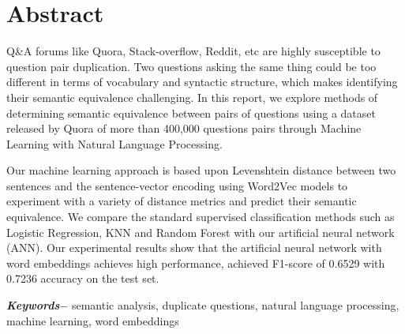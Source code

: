 \chapter*{Abstract} %
Q\&A forums like Quora, Stack-overflow, Reddit, etc are highly susceptible to question pair duplication. Two questions asking the same thing could be too different in terms of vocabulary and syntactic structure, which makes identifying their semantic equivalence challenging. In this report, we explore methods of determining semantic equivalence between pairs of questions using a dataset released by Quora of more than 400,000 questions pairs through Machine Learning with Natural Language Processing. 

Our machine learning approach is based upon Levenshtein distance between two sentences and the sentence-vector encoding using Word2Vec models to experiment with a variety of distance metrics and predict their semantic equivalence. We compare the standard supervised classification methods such as Logistic Regression, KNN and Random Forest with our artificial neural network (ANN). Our experimental results show that the artificial neural network with word embeddings achieves high performance, achieved F1-score of 0.6529 with 0.7236 accuracy on the test set.
\par
\textbf{\textit{Keywords$-$}} semantic analysis, duplicate questions, natural language processing, machine learning, word embeddings



{
\KECadjusttocspacings %
\makeatletter
\def\@makeschapterhead#1{%
  {\newpage \parindent \z@ \raggedright
    \normalfont
    \interlinepenalty\@M
    \center \fontsize{16pt}{1} \bfseries \MakeUppercase{#1}\par\nobreak
    \vskip 18\p@ %
  }}
\makeatother 

\tableofcontents %
\listoffigures %
\listoftables %
}


